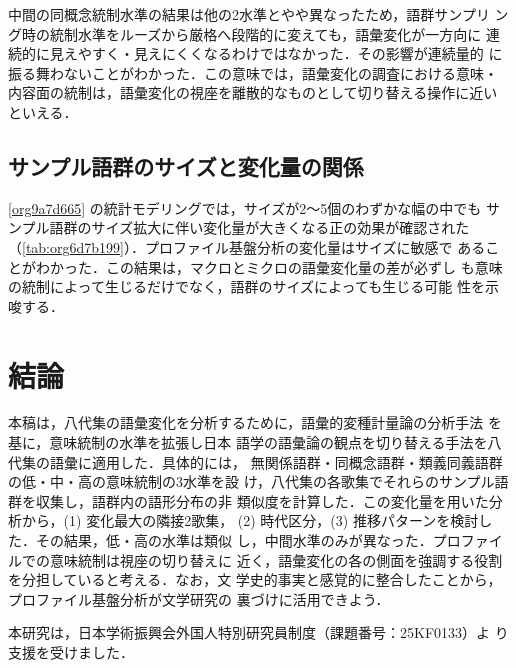 \documentclass[submit]{ipsj}
\renewcommand{\ref}{\cref}
\begin{document}
中間の同概念統制水準の結果は他の2水準とやや異なったため，語群サンプリ
ング時の統制水準をルーズから厳格へ段階的に変えても，語彙変化が一方向に
連続的に見えやすく・見えにくくなるわけではなかった．その影響が連続量的
に振る舞わないことがわかった．この意味では，語彙変化の調査における意味・
内容面の統制は，語彙変化の視座を離散的なものとして切り替える操作に近い
といえる．
\subsection{サンプル語群のサイズと変化量の関係\label{orgb4fd46f}}
\label{sec:orged41154}
\ref{org9a7d665} の統計モデリングでは，サイズが2〜5個のわずかな幅の中でも
サンプル語群のサイズ拡大に伴い変化量が大きくなる正の効果が確認された
（\ref{tab:org6d7b199}）．プロファイル基盤分析の変化量はサイズに敏感で
あることがわかった．この結果は，マクロとミクロの語彙変化量の差が必ずし
も意味の統制によって生じるだけでなく，語群のサイズによっても生じる可能
性を示唆する．
\section{結論\label{orgfeb9f1a}}
\label{sec:org2a58a03}
本稿は，八代集の語彙変化を分析するために，語彙的変種計量論の分析手法
\cite{Speelman2003Profilebased} を基に，意味統制の水準を拡張し日本
語学の語彙論の観点を切り替える手法を八代集の語彙に適用した．具体的には，
無関係語群・同概念語群・類義同義語群の低・中・高の意味統制の3水準を設
け，八代集の各歌集でそれらのサンプル語群を収集し，語群内の語形分布の非
類似度を計算した．この変化量を用いた分析から，(1) 変化最大の隣接2歌集，
(2) 時代区分，(3) 推移パターンを検討した．その結果，低・高の水準は類似
し，中間水準のみが異なった．プロファイルでの意味統制は視座の切り替えに
近く，語彙変化の各の側面を強調する役割を分担していると考える．なお，文
学史的事実と感覚的に整合したことから，プロファイル基盤分析が文学研究の
裏づけに活用できよう．

\begin{acknowledgment}
  本研究は，日本学術振興会外国人特別研究員制度（課題番号：25KF0133）よ
  り支援を受けました．
\end{acknowledgment}


\end{document}
